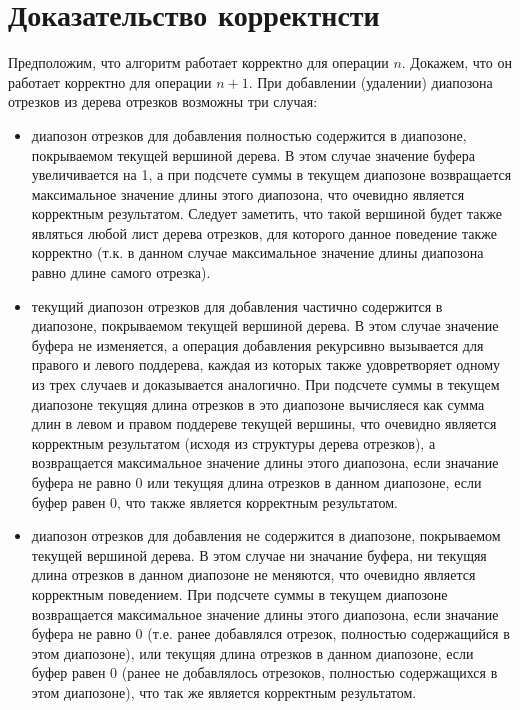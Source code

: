 \documentclass[12pt]{article}
\begin{document}
	

\section{Доказательство корректнсти}
Предположим, что алгоритм работает корректно для операции $n$. Докажем, что он работает корректно для операции $n+1$. При добавлении (удалении) диапозона отрезков из дерева отрезков возможны три случая:
\begin{itemize}

	\item диапозон отрезков для добавления полностью содержится в диапозоне, покрываемом текущей вершиной дерева. В этом случае значение буфера увеличивается на 1, а при подсчете суммы в текущем диапозоне возвращается максимальное значение длины этого диапозона, что очевидно является корректным результатом. Следует заметить, что такой вершиной будет также являться любой лист дерева отрезков, для которого данное поведение также корректно (т.к. в данном случае максимальное значение длины диапозона равно длине самого отрезка).
	
	\item текущий диапозон отрезков для добавления частично содержится в диапозоне, покрываемом текущей вершиной дерева. В этом случае значение буфера не изменяется, а операция добавления рекурсивно вызывается для правого и левого поддерева, каждая из которых также удовретворяет одному из трех случаев и доказывается аналогично. 
При подсчете суммы в текущем диапозоне текущяя длина отрезков в это диапозоне вычисляеся как сумма длин в левом и правом поддереве текущей вершины, что очевидно является корректным результатом (исходя из структуры дерева отрезков), а возвращается максимальное значение длины этого диапозона, если значание буфера не равно 0 или текущяя длина отрезков в данном диапозоне, если буфер равен 0, что также является корректным результатом.
	
	\item диапозон отрезков для добавления не содержится в диапозоне, покрываемом текущей вершиной дерева. В этом случае ни значание буфера, ни текущяя длина отрезков в данном диапозоне не меняются, что очевидно является корректным поведением. При подсчете суммы в текущем диапозоне возвращается максимальное значение длины этого диапозона, если значание буфера не равно 0 (т.е. ранее добавлялся отрезок, полностью содержащийся в этом диапозоне), или текущяя длина отрезков в данном диапозоне, если буфер равен 0 (ранее не добавлялось отрезоков, полностью содержащихся в этом диапозоне), что так же является корректным результатом.
	
\end{itemize}
\end{document}
